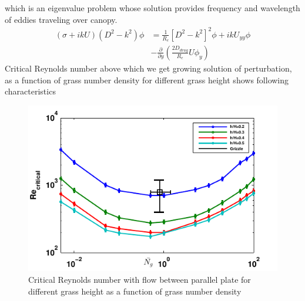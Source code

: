 \documentclass[aps,twocolumn,floatfix,prl,10pt]{revtex4-1}
\newcommand{\del}{\partial}
\begin{document}
which is an eigenvalue problem whose solution provides frequency and wavelength of eddies traveling over canopy.
\begin{equation}
\begin{split}
\left(\sigma+ikU\right) \left(D^2-k^2\right)\phi &= \frac{1}{R_{e}}\left[D^2 -k^{2} \right]^2\phi +ikU_{yy}\phi\\
&-\frac{\del}{\del y}\left(\frac{2D_{drag}}{R_e}U\phi_y\right)
\end{split}
\end{equation}
Critical Reynolds number above which we get growing solution of perturbation, as a function of grass number density for different grass height shows following characteristics 
  \begin{figure}[htb!]
  \includegraphics[]{Critical_Re_vs_Ng_Grizzle}
\caption{Critical Reynolds number with flow between parallel plate for different grass height as a function of grass number density}
\end{figure}
\end{document}
